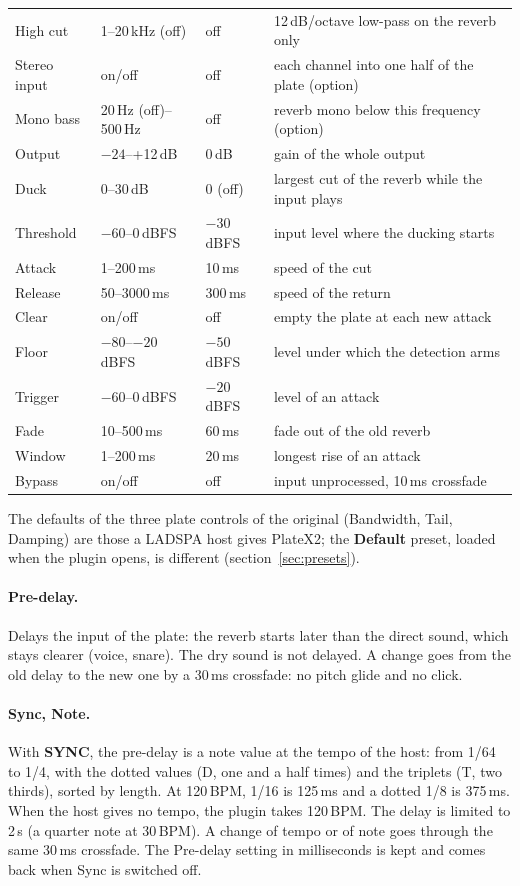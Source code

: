 \documentclass[a4paper,11pt]{article}
\newcommand{\ctl}[1]{\textsf{\textbf{#1}}}   %
\newcommand{\dB}{\,dB}
\newcommand{\dBFS}{\,dBFS}
\begin{document}
\begin{center}
\begin{tabularx}{\textwidth}{@{}l l l X@{}}
High cut & 1--20\,kHz (off) & off & 12\dB/octave low-pass on the reverb only \\
Stereo input & on/off & off & each channel into one half of the plate (option) \\
Mono bass & 20\,Hz (off)--500\,Hz & off & reverb mono below this frequency (option) \\
Output & $-24$--+12\dB & 0\dB & gain of the whole output \\
Duck & 0--30\dB & 0 (off) & largest cut of the reverb while the input plays \\
Threshold & $-60$--0\dBFS & $-30$\dBFS & input level where the ducking starts \\
Attack & 1--200\,ms & 10\,ms & speed of the cut \\
Release & 50--3000\,ms & 300\,ms & speed of the return \\
Clear & on/off & off & empty the plate at each new attack \\
Floor & $-80$--$-20$\dBFS & $-50$\dBFS & level under which the detection arms \\
Trigger & $-60$--0\dBFS & $-20$\dBFS & level of an attack \\
Fade & 10--500\,ms & 60\,ms & fade out of the old reverb \\
Window & 1--200\,ms & 20\,ms & longest rise of an attack \\
Bypass & on/off & off & input unprocessed, 10\,ms crossfade \\
\bottomrule
\end{tabularx}
\end{center}
The defaults of the three plate controls of the original (Bandwidth, Tail, Damping) are those a
LADSPA host gives PlateX2; the \ctl{Default} preset, loaded when the plugin opens, is different
(section~\ref{sec:presets}).

\paragraph{Pre-delay.} Delays the input of the plate: the reverb starts later than the direct
sound, which stays clearer (voice, snare). The dry sound is not delayed. A change goes from the
old delay to the new one by a 30\,ms crossfade: no pitch glide and no click.

\paragraph{Sync, Note.} With \ctl{SYNC}, the pre-delay is a note value at the tempo of the
host: from 1/64 to 1/4, with the dotted values (D, one and a half times) and the triplets (T,
two thirds), sorted by length. At 120\,BPM, 1/16 is 125\,ms and a dotted 1/8 is 375\,ms. When the
host gives no tempo, the plugin takes 120\,BPM. The delay is limited to 2\,s (a quarter note at
30\,BPM). A change of tempo or of note goes through the same 30\,ms crossfade. The Pre-delay
setting in milliseconds is kept and comes back when Sync is switched off.
\end{document}
